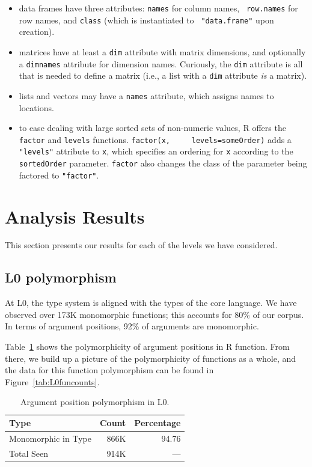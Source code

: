 \documentclass[acmsmall,10pt,review,anonymous]{acmart}\settopmatter{printfolios=true,printccs=false,printacmref=false}
\newcommand{\code}[1]{\lstinline|#1|\xspace}
\begin{document}
\begin{itemize}
\item data frames have three attributes: {\tt names} for column names, {\tt
  row.names} for row names, and {\tt class} (which is instantiated to {\tt
  "data.frame"} upon creation).
\item matrices have at least a {\tt dim} attribute with matrix dimensions,
  and optionally a {\tt dimnames} attribute for dimension names. Curiously,
  the {\tt dim} attribute is all that is needed to define a matrix (i.e., a
  list with a {\tt dim} attribute {\it is} a matrix).
\item lists and vectors may have a {\tt names} attribute, which assigns
  names to locations.
\item to ease dealing with large sorted sets of non-numeric values, R offers
  the \code{factor} and \code{levels} functions.  \code{factor(x,
    levels=someOrder)} adds a {\tt "levels"} attribute to \code{x}, which
  specifies an ordering for \code{x} according to the \code{sortedOrder}
  parameter.  \code{factor} also changes the class of the parameter being
  factored to \texttt{"factor"}.
\end{itemize}

\section{Analysis Results}\label{sec:results}

This section presents our results for each of the levels we have considered.

\subsection{L0 polymorphism}

At L0, the type system is aligned with the types of the core language.  We
have observed over 173K monomorphic functions; this accounts for 80\% of our
corpus.  In terms of argument positions, 92\% of arguments are monomorphic.

Table~\ref{tab:L0argcounts} shows the polymorphicity of argument positions
 in R function.  From there, we build up a picture of the polymorphicity of
 functions as a whole, and the data for this function polymorphism can be
 found in Figure~\ref{tab:L0funcounts}.

\begin{table}[ht]\label{tab:L0argcounts}\centering\begin{tabular}{lrr}  \hline
Type                   & Count & Percentage \\  \hline
  Monomorphic in Type & 866K & 94.76 \\ 
  Total Seen & 914K & --- \\ 
   \hline
\end{tabular}
\caption{Argument position polymorphism in L0.}
\end{table}
\end{document}
